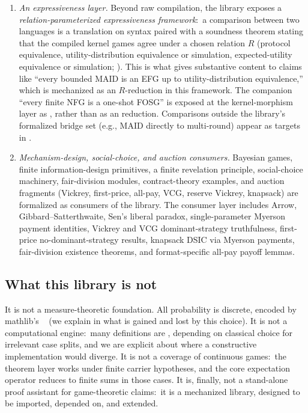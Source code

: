 \begin{enumerate}[leftmargin=*]
\item \emph{An expressiveness layer.}  Beyond raw compilation, the
library exposes a \emph{relation-parameterized expressiveness
framework}:\ a comparison between two languages is a translation
on syntax paired with a soundness theorem stating that the
compiled kernel games agree under a chosen relation $R$
(protocol equivalence, utility-distribution equivalence or simulation,
expected-utility equivalence or simulation;
).  This is what gives
substantive content to claims like ``every bounded MAID is an EFG
up to utility-distribution equivalence,'' which is mechanized as an
$R$-reduction in this framework.  The companion ``every finite NFG is
a one-shot FOSG'' is exposed at the kernel-morphism layer as
, rather than as an
 reduction.  Comparisons outside the library's
formalized bridge set (e.g., MAID directly to multi-round) appear as
targets in .

\item \emph{Mechanism-design, social-choice, and auction consumers.}
Bayesian games, finite information-design primitives, a finite
revelation principle, social-choice machinery, fair-division modules,
contract-theory examples, and auction fragments (Vickrey, first-price,
all-pay, VCG, reserve Vickrey, knapsack)
are formalized as consumers of the library.  The consumer layer
includes Arrow, Gibbard--Satterthwaite, Sen's liberal paradox,
single-parameter Myerson payment identities, Vickrey and VCG
dominant-strategy truthfulness, first-price no-dominant-strategy
results, knapsack DSIC via Myerson payments, fair-division existence
theorems, and format-specific all-pay payoff lemmas.
\end{enumerate}

\subsection{What this library is not}

It is not a measure-theoretic foundation.  All probability is
discrete, encoded by mathlib's ~\citep{mathlib2020} (we
explain in  what is gained and lost by this
choice).  It is not a computational engine:\ many definitions are
, depending on classical choice for irrelevant
case splits, and we are explicit about where a constructive
implementation would diverge.  It is not a coverage of continuous
games:\ the theorem layer works under finite carrier hypotheses, and
the core expectation operator reduces to finite sums in those cases.
It is, finally, not a stand-alone proof assistant for
game-theoretic claims:\ it is a mechanized library, designed to be
imported, depended on, and extended.

